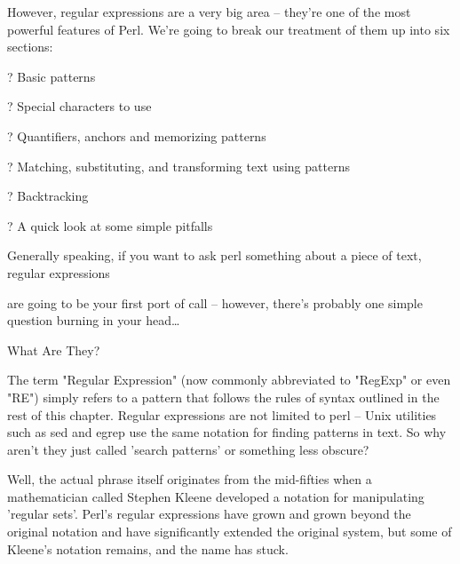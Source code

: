 \documentclass[a4paper,11pt]{book}
\begin{document}
\noindent 

\noindent However, regular expressions are a very big area -- they're one of the most powerful features of Perl. We're going to break our treatment of them up into six sections:

\noindent 

\noindent ? Basic patterns

\noindent 

\noindent ? Special characters to use

\noindent 

\noindent ? Quantifiers, anchors and memorizing patterns

\noindent 

\noindent ? Matching, substituting, and transforming text using patterns

\noindent 

\noindent ? Backtracking

\noindent 

\noindent ? A quick look at some simple pitfalls

\noindent 

\noindent Generally speaking, if you want to ask perl something about a piece of text, regular expressions

\noindent are going to be your first port of call -- however, there's probably one simple question burning in your head\dots 

\noindent  

\noindent  

\noindent  

\noindent  

\noindent 

\noindent 

\noindent What Are They?

\noindent 

\noindent The term "Regular Expression" (now commonly abbreviated to "RegExp" or even "RE") simply refers to a pattern that follows the rules of syntax outlined in the rest of this chapter. Regular expressions are not limited to perl -- Unix utilities such as sed and egrep use the same notation for finding patterns in text. So why aren't they just called 'search patterns' or something less obscure?

\noindent 

\noindent Well, the actual phrase itself originates from the mid-fifties when a mathematician called Stephen Kleene developed a notation for manipulating 'regular sets'. Perl's regular expressions have grown and grown beyond the original notation and have significantly extended the original system, but some of Kleene's notation remains, and the name has stuck.
\end{document}

